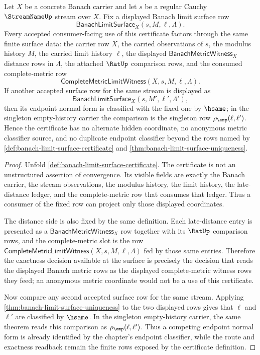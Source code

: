 \begin{corollary}
\label{cor:banach-limit-surface-certificate-determinacy}
Let $X$ be a concrete Banach carrier and let $s$ be a regular Cauchy
$\StreamNameUp$ stream over $X$. Fix a displayed Banach limit surface row
$$
\mathsf{BanachLimitSurface}_X(s,M,\ell,\Lambda).
$$
Every accepted consumer-facing use of this certificate factors through the
same finite surface data: the carrier row $X$, the carried observations of
$s$, the modulus history $M$, the carried limit history $\ell$, the displayed
$\mathsf{BanachMetricWitness}_X$ distance rows in $\Lambda$, the attached
$\RatUp$ comparison rows, and the consumed complete-metric row
$$
\mathsf{CompleteMetricLimitWitness}(X,s,M,\ell,\Lambda).
$$
If another accepted surface row for the same stream is displayed as
$$
\mathsf{BanachLimitSurface}_X(s,M',\ell',\Lambda'),
$$
then its endpoint normal form is classified with the fixed one by $\hsame$;
in the singleton empty-history carrier the comparison is the singleton row
$\rho_{\emp}(\ell,\ell')$. Hence the certificate has no alternate hidden
coordinate, no anonymous metric classifier source, and no duplicate endpoint
classifier beyond the rows named by
\autoref{def:banach-limit-surface-certificate} and
\autoref{thm:banach-limit-surface-uniqueness}.
\end{corollary}
\begin{proof}
Unfold \autoref{def:banach-limit-surface-certificate}. The certificate is not
an unstructured assertion of convergence. Its visible fields are exactly the
Banach carrier, the stream observations, the modulus history, the limit
history, the late-distance ledger, and the complete-metric row that consumes
that ledger. Thus a consumer of the fixed row can project only those displayed
coordinates.

The distance side is also fixed by the same definition. Each late-distance
entry is presented as a $\mathsf{BanachMetricWitness}_X$ row together with its
$\RatUp$ comparison rows, and the complete-metric slot is the row
$\mathsf{CompleteMetricLimitWitness}(X,s,M,\ell,\Lambda)$ fed by those same
entries. Therefore the exactness decision available at the surface is precisely
the decision that reads the displayed Banach metric rows as the displayed
complete-metric witness rows they feed; an anonymous metric coordinate would
not be a use of this certificate.

Now compare any second accepted surface row for the same stream. Applying
\autoref{thm:banach-limit-surface-uniqueness} to the two displayed rows gives
that $\ell$ and $\ell'$ are classified by $\hsame$. In the singleton
empty-history carrier, the same theorem reads this comparison as
$\rho_{\emp}(\ell,\ell')$. Thus a competing endpoint normal form is already
identified by the chapter's endpoint classifier, while the route and exactness
readback remain the finite rows exposed by the certificate definition.
\end{proof}
